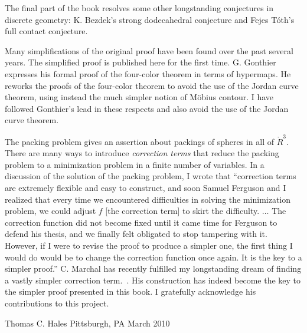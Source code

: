 The final part of the book resolves some other longstanding conjectures in
discrete geometry: K. Bezdek's strong dodecahedral conjecture and Fejes
T\'oth's full contact conjecture.

Many simplifications of the original proof have been found over the past
several years.  The simplified proof is published here for the first time.
G. Gonthier expresses his formal proof of the four-color
theorem in terms of hypermaps.  He reworks the proofs of the
four-color theorem to avoid the use of the Jordan curve theorem, using
instead the much simpler notion of M\"obius contour.  I have followed
Gonthier's lead in these respects and also avoid the use of the Jordan curve theorem.

The packing problem gives an assertion about packings of spheres in
all of $\ring{R}^3$.  There are many ways to introduce {\it correction
  terms} that reduce the packing problem to a minimization problem in
a finite number of variables.  In a discussion of the solution of the
packing problem, I wrote that ``correction terms are extremely
flexible and easy to construct, and soon Samuel Ferguson and I
realized that every time we encountered difficulties in solving the
minimization problem, we could adjust $f$ [the correction term] to
skirt the difficulty. $\ldots$ The correction function did not become
fixed until it came time for Ferguson to defend his thesis, and we
finally felt obligated to stop tampering with it.  However, if I were
to revise the proof to produce a simpler one, the first thing I would
do would be to change the correction function once again.  It is the
key to a simpler proof.''  C. Marchal has recently fulfilled my
longstanding dream of finding a vastly simpler correction term.~\cite{unknown}.  His
construction has indeed become the key to the simpler proof presented
in this book.  I gratefully acknowledge his contributions to this
project.





\bigskip
\hbox{}



\bigskip
\hbox{}

{
\parindent=0pt
\obeylines

Thomas C. Hales
Pittsburgh, PA
March 2010

}







